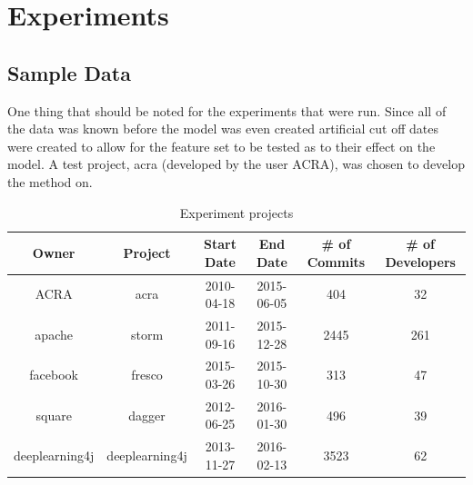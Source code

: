 \chapter{Experiments}
\label{chap:experiments}

\section{Sample Data}
\label{sec:sample_data}


One thing that should be noted for the experiments that were run. Since all of the data was known before the model was even created artificial cut off dates were created to allow for the feature set to be tested as to their effect on the model. A test project, acra (developed by the user ACRA), was chosen to develop the method on. 


\begin{table}
\begin{center}
    \begin{tabular}{|c|c|c|c|c|c|}
        \hline
        Owner & Project & Start Date & End Date & \# of Commits & \# of Developers \\
        \hline
        ACRA & acra & 2010-04-18 & 2015-06-05 & 404 & 32 \\
        apache & storm & 2011-09-16 & 2015-12-28 & 2445 & 261 \\
        facebook & fresco & 2015-03-26 & 2015-10-30 & 313 & 47 \\
        square & dagger & 2012-06-25 & 2016-01-30 & 496 & 39 \\
        deeplearning4j & deeplearning4j & 2013-11-27 & 2016-02-13 & 3523 & 62 \\
        \hline
    \end{tabular}
\end{center}
\caption{Experiment projects}
\label{tab:project_summary}
\end{table}

